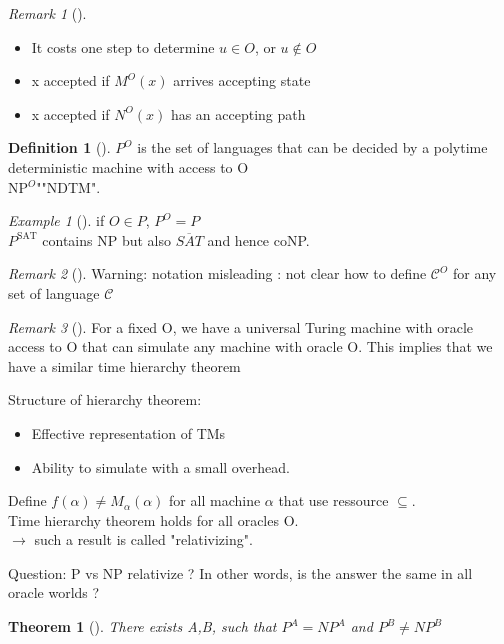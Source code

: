 \documentclass{article}
\newtheorem{theorem}{Theorem}
\theoremstyle{definition}
\newtheorem{definition}{Definition}
\theoremstyle{remark}
\newtheorem*{remark}{Remark}
\newtheorem*{example}{Example}
\newcommand{\Thm}[3]{\begin{theorem}[#1]\label{#2}#3\end{theorem}}
\newcommand{\Ex}[3]{\begin{example}[#1]\label{#2}#3\end{example}}
\newcommand{\Def}[3]{\begin{definition}[#1]\label{#2}#3\end{definition}}
\newcommand{\Rem}[3]{\begin{remark}[#1]\label{#2}#3\end{remark}}
\begin{document}
\Rem{}{}{\begin{itemize}
		\item It costs one step to determine $u \in O$, or $u \notin O$
		\item x accepted if $M^O(x)$ arrives accepting state
		\item x accepted if $N^O(x)$ has an accepting path
	\end{itemize}}
	
\Def{}{}{$P^O$ is the set of languages that can be decided by a polytime deterministic machine with access to O\\
	NP$^O$\indent"\indent"\indent NDTM\indent".}

\Ex{}{}{if $O \in P$, $P^O = P$\\
	$P^{\text{SAT}}$ contains NP but also $\overline{SAT}$ and hence coNP.
}
\Rem{}{}{Warning: notation misleading : not clear how to define $\mathcal{C}^O$ for any set of language $\mathcal{C}$}

\Rem{}{}{For a fixed O, we have a universal Turing machine with oracle access to O that can simulate any machine with oracle O. This implies that we have a similar time hierarchy theorem}

Structure of hierarchy theorem:\begin{itemize}
	\item Effective representation of TMs
	\item Ability to simulate with a small overhead.
\end{itemize}
Define $f(\alpha) \neq M_\alpha(\alpha)$ for all machine $\alpha$ that use ressource $\subseteq$.\\

Time hierarchy theorem holds for all oracles O.\\
$\rightarrow$ such a result is called "relativizing".

Question: P vs NP relativize ?
In other words, is the answer the same in all oracle worlds ?

\Thm{}{}{There exists A,B, such that $P^A = NP^A$ and $P^B \neq NP^B$}
\end{document}
